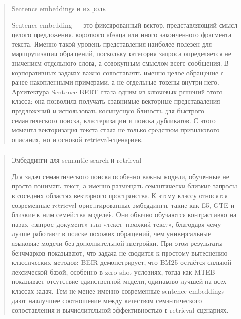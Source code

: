 \begin{quote}
Sentence embeddings и их роль

Sentence embedding --- это фиксированный вектор, представляющий смысл
целого предложения, короткого абзаца или иного законченного фрагмента
текста. Именно такой уровень представления наиболее полезен для
маршрутизации обращений, поскольку категория запроса определяется не
значением отдельного слова, а совокупным смыслом всего сообщения. В
корпоративных задачах важно сопоставлять именно целое обращение с ранее
накопленными примерами, а не отдельные токены внутри него. Архитектура
Sentence-BERT стала одним из ключевых решений этого класса: она
позволила получать сравнимые векторные представаления предложений и
использовать косинусную близость для быстрого семантического поиска,
кластеризации и поиска дубликатов. С этого момента векторизация текста
стала не только средством признакового описания, но и основой
retrieval-сценариев.
\end{quote}

\hypertarget{section-5}{%
\subsubsection{}\label{section-5}}

\begin{quote}
Эмбеддинги для semantic search и retrieval

Для задач семантического поиска особенно важны модели, обученные не
просто понимать текст, а именно размещать семантически близкие запросы в
соседних областях векторного пространства. К этому классу относятся
современные retrieval-ориентированные эмбеддинги, такие как E5, GTE и
близкие к ним семейства моделей. Они обычно обучаются контрастивно на
парах «запрос--документ» или «текст--похожий текст», благодаря чему
лучше работают в поиске похожих обращений, чем универсальные языковые
модели без дополнительной настройки. При этом результаты бенчмарков
показывают, что задача не сводится к простому вытеснению классических
методов: BEIR демонстрирует, что BM25 остаётся сильной лексической
базой, особенно в zero-shot условиях, тогда как MTEB показывает
отсутствие единственной модели, одинаково лучшей на всех классах задач.
Тем не менее именно современные sentence embeddings дают наилучшее
соотношение между качеством семантического сопоставления и
вычислительной эффективностью в retrieval-сценариях.
\end{quote}

\hypertarget{section-6}{%
\subsubsection{}\label{section-6}}

